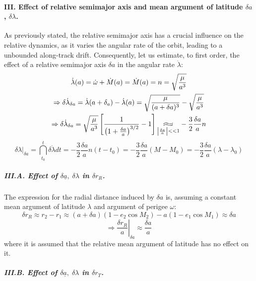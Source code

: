 			\paragraph{\textcolor{GMVred}{III.} Effect of relative semimajor axis and mean argument of latitude $\delta a$, $\delta \lambda$. \\}
			\indent As previously stated, the relative semimajor axis has a crucial influence on the relative dynamics, as it varies the angular rate of the orbit, leading to a unbounded along-track drift. Consequently, let us estimate, to first order, the effect of a relative semimajor axis $\delta a$ in the angular rate $\dot{\lambda}$:
			\[
			\begin{array}{ccc}
			\dot{\lambda}(a) = \dot{\omega} + \dot{M}(a) = \dot{M}(a) = n = \dsqrt{\dfrac{\mu}{a^3}}\\[1em]
			\Rightarrow \delta\dot{\lambda}_{\delta a} = \dot{\lambda}(a + \delta_a) - \dot{\lambda}(a) =\dsqrt{\dfrac{\mu}{(a + \delta a)^3}} - \dsqrt{\dfrac{\mu}{a^3}}  \\[1em]
			\Rightarrow \delta\dot{\lambda}_{\delta a}= \dsqrt{\dfrac{\mu}{a^3}}\left[ \dfrac{1}{\left(1 + \frac{\delta a}{a}\right)^{3/2}} - 1\right] \underset{\tiny{\abs{\frac{\delta a}{a}}<<1}}{\longapprox} - \dfrac{3}{2}\dfrac{\delta a}{a} n
			\end{array}
			\]
			\begin{equation}
			\label{eqCh2:dLambda} \delta \lambda\rvert_{\delta a} = \dint_{t_0}^{t} \delta \dot{\lambda} dt = - \dfrac{3}{2}\dfrac{\delta a}{a} n (t - t_0) = - \dfrac{3}{2}\dfrac{\delta a}{a} (M - M_0) = - \dfrac{3}{2}\dfrac{\delta a}{a} (\lambda - \lambda_0)
			\end{equation}
			\subparagraph{\textcolor{GMVred}{III.A.} Effect of $\delta \underline{a}, \; \delta \lambda$ in $\delta r_R$. \\}
			\indent The expression for the radial distance induced by $\delta a$ is, assuming a constant mean argument of latitude $\lambda$ and argument of perigee $\omega$:
			\[
			\delta r_R \approx r_2 - r_1 \approx (a + \delta a) (1 - e_2 \cos M_2) - a (1 - e_1 \cos M_1) \approx \delta a
			\]
			\begin{equation}
			\label{eqCh2:r_R_a} \Rightarrow \left.\dfrac{\delta r_R}{a}\right\rvert_{\delta a} \approx \dfrac{\delta a}{a}
			\end{equation}
			\noindent where it is assumed that the relative mean argument of latitude has no effect on it.
			\subparagraph{\textcolor{GMVred}{III.B.} Effect of $\delta \underline{a}, \; \delta \lambda$ in $\delta r_T$. \\}
